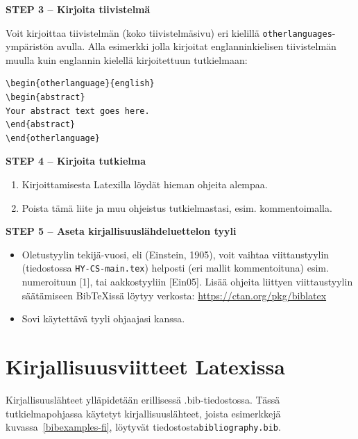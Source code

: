 {\textbf{STEP 3 -- Kirjoita tiivistelmä}}

Voit kirjoittaa tiivistelmän (koko tiivistelmäsivu) eri kielillä \texttt{otherlanguages}-ym\-pä\-ris\-tön avulla. Alla esimerkki jolla kirjoitat englanninkielisen tiivistelmän muulla kuin englannin kielellä kirjoitettuun tutkielmaan:

\begin{verbatim}
\begin{otherlanguage}{english}
\begin{abstract}
Your abstract text goes here.
\end{abstract}
\end{otherlanguage}
\end{verbatim}


{\textbf{STEP 4 -- Kirjoita tutkielma}}

\begin{enumerate}
\item Kirjoittamisesta Latexilla löydät hieman ohjeita alempaa.
\item Poista tämä liite ja muu ohjeistus tutkielmastasi, esim. kommentoimalla.
\end{enumerate}

{\textbf{STEP 5 -- Aseta kirjallisuuslähdeluettelon tyyli}}

\begin{itemize}
\item Oletustyylin tekijä-vuosi, eli (Einstein, 1905), voit vaihtaa viittaustyylin (tiedostossa \texttt{HY-CS-main.tex}) helposti (eri mallit kommentoituna) esim. numeroituun [1], tai aakkostyyliin [Ein05].
Lisää ohjeita liittyen viittaustyylin säätämiseen {Bib}\TeX issä löytyy verkosta: \url{https://ctan.org/pkg/biblatex}
\item Sovi käytettävä tyyli ohjaajasi kanssa.
\end{itemize}

\section{Kirjallisuusviitteet Latexissa}

Kirjallisuuslähteet ylläpidetään erillisessä .bib-tiedostossa. Tässä tutkielmapohjassa käy\-te\-tyt kirjallisuuslähteet, joista esimerkkejä kuvassa~\ref{bibexamples-fi}, löytyvät tiedostosta\newline \texttt{bibliography.bib}.

